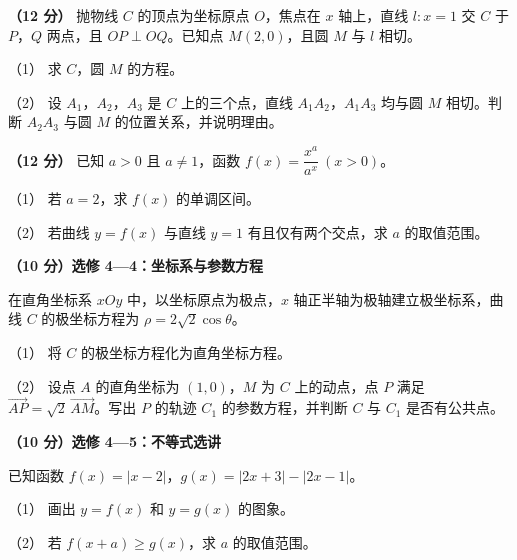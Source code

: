 \begin{question}
\textbf{（12 分）} 抛物线 $C$ 的顶点为坐标原点 $O$，焦点在 $x$ 轴上，直线 $l:x=1$ 交 $C$ 于 $P$，$Q$ 两点，且 $OP\perp OQ$。已知点 $M(2,0)$，且圆 $M$ 与 $l$ 相切。

（1） 求 $C$，圆 $M$ 的方程。

（2） 设 $A_1$，$A_2$，$A_3$ 是 $C$ 上的三个点，直线 $A_1A_2$，$A_1A_3$ 均与圆 $M$ 相切。判断 $A_2A_3$ 与圆 $M$ 的位置关系，并说明理由。

\end{question}
\begin{question}
\textbf{（12 分）} 已知 $a>0$ 且 $a\ne1$，函数 $f(x)=\dfrac{x^a}{a^x}\ (x>0)$。

（1） 若 $a=2$，求 $f(x)$ 的单调区间。

（2） 若曲线 $y=f(x)$ 与直线 $y=1$ 有且仅有两个交点，求 $a$ 的取值范围。

\end{question}
\begin{question}
\textbf{（10 分）选修 4—4：坐标系与参数方程} 

在直角坐标系 $xOy$ 中，以坐标原点为极点，$x$ 轴正半轴为极轴建立极坐标系，曲线 $C$ 的极坐标方程为 $\rho=2\sqrt2\cos\theta$。

（1） 将 $C$ 的极坐标方程化为直角坐标方程。

（2） 设点 $A$ 的直角坐标为 $(1,0)$，$M$ 为 $C$ 上的动点，点 $P$ 满足 $\overrightarrow{AP}=\sqrt2\,\overrightarrow{AM}$。写出 $P$ 的轨迹 $C_1$ 的参数方程，并判断 $C$ 与 $C_1$ 是否有公共点。

\Needspace{0.4\textheight}
\end{question}
\begin{question}
\textbf{（10 分）选修 4—5：不等式选讲} 

已知函数 $f(x)=|x-2|$，$g(x)=|2x+3|-|2x-1|$。
\nopagebreak[4]
\begin{center}\end{center}
\nopagebreak[4]
（1） 画出 $y=f(x)$ 和 $y=g(x)$ 的图象。

（2） 若 $f(x+a)\geqslant g(x)$，求 $a$ 的取值范围。

\clearpage

\end{question}